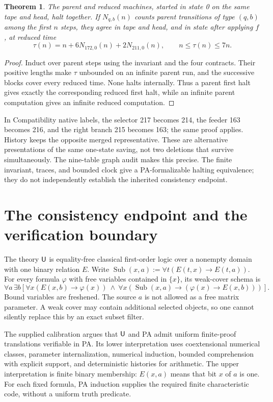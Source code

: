 \documentclass[11pt,letterpaper]{article}
\newtheorem{theorem}{Theorem}[section]\newtheorem{lemma}[theorem]{Lemma}\newtheorem{proposition}[theorem]{Proposition}
\begin{document}
\begin{theorem}
The parent and reduced machines, started in state 0 on the same tape and head,
halt together. If $N_{q,b}(n)$ counts parent transitions of type $(q,b)$ among
the first $n$ steps, they agree in tape and head, and in state after applying
$f$, at reduced time
\[
 \tau(n)=n+6N_{172,0}(n)+2N_{211,0}(n),\qquad n\le\tau(n)\le7n.
\]
\end{theorem}
\begin{proof}
Induct over parent steps using the invariant and the four contracts. Their
positive lengths make $\tau$ unbounded on an infinite parent run, and the
successive blocks cover every reduced time. None halts internally. Thus a
parent first halt gives exactly the corresponding reduced first halt, while
an infinite parent computation gives an infinite reduced computation.
\end{proof}
In Compatibility native labels, the selector 217 becomes 214, the feeder 163
becomes 216, and the right branch 215 becomes 163; the same proof applies.
History keeps the opposite merged representative. These are alternative
presentations of the same one-state saving, not two deletions that survive
simultaneously. The nine-table graph audit makes this precise. The finite
invariant, traces, and bounded clock give a PA-formalizable halting equivalence;
they do not independently establish the inherited consistency endpoint.

\clearpage
\section{The consistency endpoint and the verification boundary}
The theory $\mathsf U$ is equality-free classical first-order logic over a nonempty
domain with one binary relation $E$. Write
$\operatorname{Sub}(x,a):=\forall t(E(t,x)\to E(t,a))$.
For every formula $\varphi$ with free variables contained in $\{x\}$, its
weak-cover schema is
\[
 \forall a\,\exists b\left[
  \forall x(E(x,b)\to\varphi(x))\ \land\
  \forall x(\operatorname{Sub}(x,a)\to(\varphi(x)\to E(x,b)))
 \right].
\]
Bound variables are freshened. The source $a$ is not allowed as a free matrix
parameter. A weak cover may contain additional selected objects, so one cannot
silently replace this by an exact subset filter.

The supplied calibration argues that $\mathsf U$ and PA admit uniform finite-proof
translations verifiable in PA. Its lower interpretation uses coextensional
numerical classes, parameter internalization, numerical induction, bounded
comprehension with explicit support, and deterministic histories for arithmetic.
The upper interpretation is finite binary membership: $E(x,a)$ means that bit
$x$ of $a$ is one. For each fixed formula, PA induction supplies the required
finite characteristic code, without a uniform truth predicate.
\end{document}
